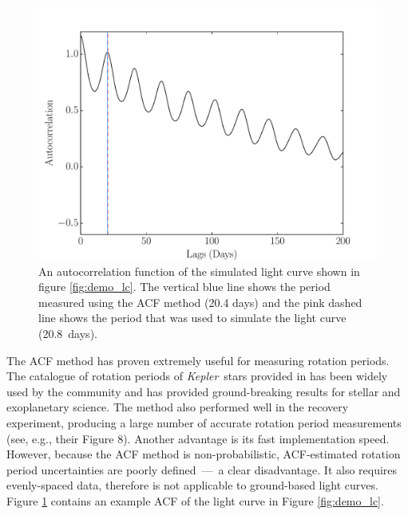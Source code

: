 \documentclass[a4paper,fleqn,usenatbib,useAMS]{mnras}
\newcommand{\Kepler}{{\it Kepler}}
\newcommand{\aigrainexampleperiod}{20.8}
\begin{document}
\begin{figure}
\begin{center}
\includegraphics[width=\columnwidth, clip=true]{figures/demo_ACF.pdf}
\caption[ACF of a simulated light curve.]
{An autocorrelation function of the simulated light curve shown in figure
\ref{fig:demo_lc}.
The vertical blue line shows the period measured using the ACF method (20.4
days) and the pink dashed line shows the period that was used to simulate the
light curve (\aigrainexampleperiod\ days).}
\label{fig:demo_acf}
\end{center}
\end{figure}

The ACF method has proven extremely useful for measuring rotation periods.
The catalogue of rotation periods of \Kepler\ stars provided in
\citet{Mcquillan2013} has been widely used by the community and has provided
ground-breaking results for stellar and exoplanetary science.
The method also performed well in the \citet{Aigrain2015}
recovery experiment,
producing a large number of accurate rotation period measurements
(see, e.g., their Figure 8).
Another advantage is its fast implementation speed.
However, because the ACF method is non-probabilistic, ACF-estimated rotation
period uncertainties are poorly defined~---~a clear disadvantage.
It also requires evenly-spaced data, therefore is not applicable to
ground-based light curves.
Figure \ref{fig:demo_acf} contains an example ACF of the light curve in
Figure \ref{fig:demo_lc}.
\end{document}
